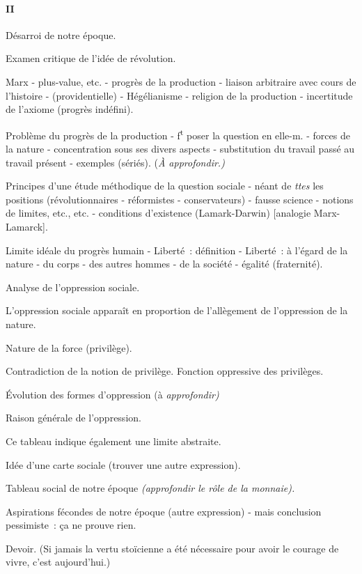 \documentclass[french,twoside]{book} %
\begin{document}
\paragraph[II]{II}
\noindent Désarroi de notre époque.\par
Examen critique de l'idée de révolution.\par
Marx - plus-value, etc. - progrès de la production - liaison arbitraire avec cours de l'histoire - (providentielle) - Hégélianisme - religion de la production - incertitude de l'axiome (progrès indéfini).\par
Problème du progrès de la production - f\textsuperscript{t} poser la question en elle-m. - forces de la nature - concentration sous ses divers aspects - substitution du travail passé au travail présent - exemples (sériés). ({\itshape À approfondir.)}\par
Principes d'une étude méthodique de la question sociale - néant de {\itshape ttes} les positions (révolutionnaires - réformistes - conservateurs) - fausse science - notions de limites, etc., etc. - conditions d'existence (Lamark-Darwin) [analogie Marx-Lamarck].\par
Limite idéale du progrès humain - Liberté : définition - Liberté : à l'égard de la nature - du corps - des autres hommes - de la société - égalité (fraternité).\par
Analyse de l'oppression sociale.\par
L'oppression sociale apparaît en proportion de l'allègement de l'oppression de la nature.\par
Nature de la force (privilège).\par
Contradiction de la notion de privilège. Fonction oppressive des privilèges.\par
Évolution des formes d'oppression (à {\itshape approfondir)}\par
Raison générale de l'oppression.\par
Ce tableau indique également une limite abstraite.\par
Idée d'une carte sociale (trouver une autre expression).\par
Tableau social de notre époque {\itshape (approfondir le rôle de la monnaie).}\par
Aspirations fécondes de notre époque (autre expression) - mais conclusion pessimiste : ça ne prouve rien.\par
Devoir. (Si jamais la vertu stoïcienne a été nécessaire pour avoir le courage de vivre, c'est aujourd'hui.)
\end{document}

